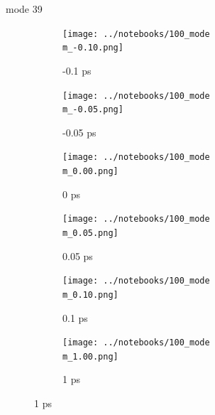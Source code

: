 \documentclass{beamer}
\begin{document}
\renewcommand\m{39}
\begin{frame}{mode \m}
	\begin{figure}
		\centering
		\begin{subfigure}[b]{\w\textwidth}
			\centering
			\texttt{[image: ../notebooks/100\_mode\\m\_-0.10.png]}
			\caption{-0.1 ps}
		\end{subfigure}
		\begin{subfigure}[b]{\w\textwidth}
			\centering
			\texttt{[image: ../notebooks/100\_mode\\m\_-0.05.png]}
			\caption{-0.05 ps}
		\end{subfigure}
		\begin{subfigure}[b]{\w\textwidth}
			\centering
			\texttt{[image: ../notebooks/100\_mode\\m\_0.00.png]}
			\caption{0 ps}
		\end{subfigure}
		\begin{subfigure}[b]{\w\textwidth}
			\centering
			\texttt{[image: ../notebooks/100\_mode\\m\_0.05.png]}
			\caption{0.05 ps}
		\end{subfigure}
		\begin{subfigure}[b]{\w\textwidth}
			\centering
			\texttt{[image: ../notebooks/100\_mode\\m\_0.10.png]}
			\caption{0.1 ps}
		\end{subfigure}
		\begin{subfigure}[b]{\w\textwidth}
			\centering
			\texttt{[image: ../notebooks/100\_mode\\m\_1.00.png]}
			\caption{1 ps}
		\end{subfigure}
	\end{figure}
\end{frame}
\end{document}
